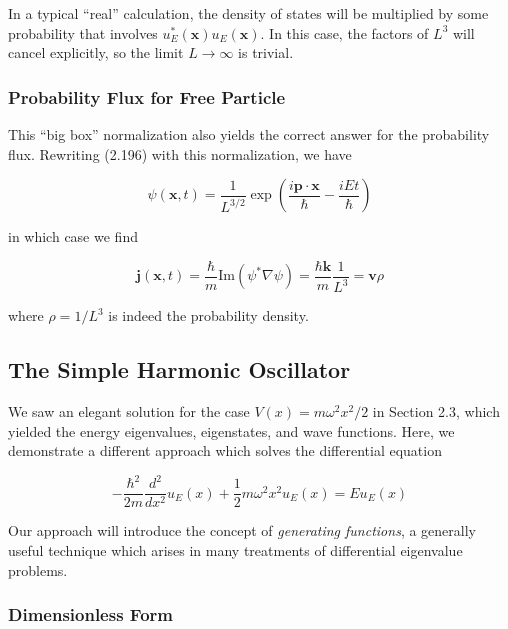 \documentclass[11pt,a4paper]{article}
\begin{document}
In a typical ``real'' calculation, the density of states will be multiplied by some probability that involves $u_E^*(\mathbf{x})u_E(\mathbf{x})$. In this case, the factors of $L^3$ will cancel explicitly, so the limit $L \to \infty$ is trivial.

\subsubsection{Probability Flux for Free Particle}

This ``big box'' normalization also yields the correct answer for the probability flux. Rewriting (2.196) with this normalization, we have

\begin{equation}
\psi(\mathbf{x}, t) = \frac{1}{L^{3/2}}\exp\left(\frac{i\mathbf{p}\cdot\mathbf{x}}{\hbar} - \frac{iEt}{\hbar}\right)
\tag{2.215}
\end{equation}

in which case we find

\begin{equation}
\mathbf{j}(\mathbf{x}, t) = \frac{\hbar}{m}\text{Im}(\psi^*\nabla\psi) = \frac{\hbar\mathbf{k}}{m}\frac{1}{L^3} = \mathbf{v}\rho
\tag{2.216}
\end{equation}

where $\rho = 1/L^3$ is indeed the probability density.

\subsection{The Simple Harmonic Oscillator}

We saw an elegant solution for the case $V(x) = m\omega^2 x^2/2$ in Section 2.3, which yielded the energy eigenvalues, eigenstates, and wave functions. Here, we demonstrate a different approach which solves the differential equation

\begin{equation}
-\frac{\hbar^2}{2m}\frac{d^2}{dx^2}u_E(x) + \frac{1}{2}m\omega^2 x^2 u_E(x) = Eu_E(x)
\tag{2.217}
\end{equation}

Our approach will introduce the concept of \textit{generating functions}, a generally useful technique which arises in many treatments of differential eigenvalue problems.

\subsubsection{Dimensionless Form}
\end{document}
